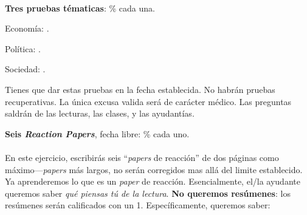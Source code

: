 \documentclass[letterpaper]{article}
\renewenvironment{itemize}{
  \begin{list}{}{
    \setlength{\leftmargin}{1.5em}
  }
}{
  \end{list}
}
\begin{document}
\begin{enumerate}
	\\

	\item {\bf Tres pruebas t\'ematicas}: {\unskip}\% cada una.

		\begin{itemize}
			\item[$\bullet$] Econom\'ia: {\unskip}.
			\item[$\bullet$] Pol\'itica: {\unskip}.
			\item[$\bullet$] Sociedad: {\unskip}.
		\end{itemize}

Tienes que dar estas pruebas en la fecha establecida. No habr\'an pruebas recuperativas. La \'unica excusa valida ser\'a de car\'acter m\'edico. Las preguntas saldr\'an de las lecturas, las clases, y las ayudant\'ias.


	\item {\bf Seis \emph{Reaction Papers}}, fecha libre: {\unskip}\% cada uno.
	\\ 
	\\
	En este ejercicio, escribir\'as seis ``\emph{papers} de reacci\'on'' de dos p\'aginas como m\'aximo---{\emph{papers}} m\'as largos, no ser\'an corregidos mas all\'a del limite establecido. Ya aprenderemos lo que es un \emph{paper} de reacci\'on. Esencialmente, el/la ayudante queremos saber \emph{qu\'e piensas t\'u de la lectura}. {\bf No queremos res\'umenes}: los res\'umenes ser\'an calificados con un 1. Espec\'ificamente, queremos saber: 


\end{enumerate}
\end{document}
